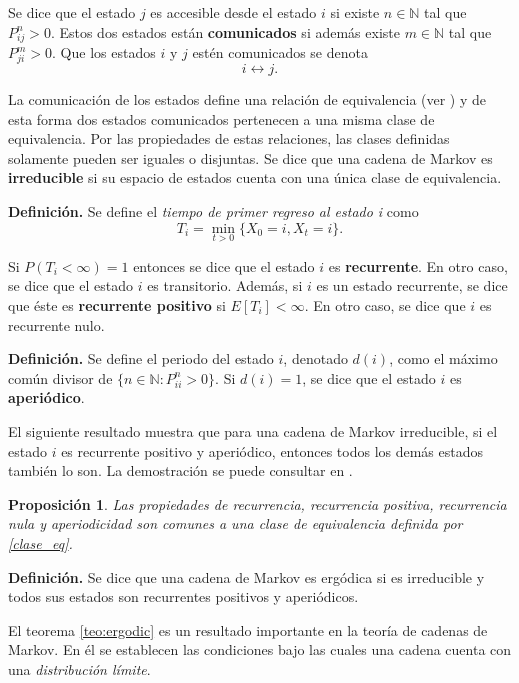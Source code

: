 \documentclass[11pt,a4paper]{article}
\newtheorem{proposition}{Proposición}[subsection]
\begin{document}
Se dice que el estado $j$ es accesible desde el estado $i$ si existe $n \in \mathbb{N}$ tal que $P_{ij}^n > 0$. Estos dos estados están \textbf{comunicados} si además existe $m \in \mathbb{N}$ tal que $P_{ji}^m > 0$. Que los estados $i$ y $j$ estén comunicados se denota
\begin{equation} \label{clase_eq}
i \leftrightarrow j.
\end{equation}

La comunicación de los estados define una relación de equivalencia (ver \citet{ross}) y de esta forma dos estados comunicados pertenecen a una misma clase de equivalencia. Por las propiedades de estas relaciones, las clases definidas solamente pueden ser iguales o disjuntas. Se dice que una cadena de Markov es \textbf{irreducible} si su espacio de estados cuenta con una única clase de equivalencia.

\textbf{Definición.} Se define el \textit{tiempo de primer regreso al estado i} como $$T_i = \min_{t>0} \lbrace X_0 = i, X_t = i \rbrace.$$

Si $P\left( T_i < \infty \right) = 1 $ entonces se dice que el estado $i$ es \textbf{recurrente}. En otro caso, se dice que el estado $i$ es transitorio. Además, si $i$ es un estado recurrente, se dice que éste es \textbf{recurrente positivo} si $E\left[T_i\right] < \infty$. En otro caso, se dice que $i$ es recurrente nulo.

\textbf{Definición.} Se define el periodo del estado $i$, denotado $d(i)$, como el máximo común divisor de $\lbrace n\in \mathbb{N}: P_{ii}^n > 0\rbrace.$ Si $d(i)=1$, se dice que el estado $i$ es \textbf{aperiódico}.

El siguiente resultado muestra que para una cadena de Markov irreducible, si el estado $i$ es recurrente positivo y aperiódico, entonces todos los demás estados también lo son. La demostración se puede consultar en \citet{ross}.

\begin{proposition}
Las propiedades de recurrencia, recurrencia positiva, recurrencia nula y aperiodicidad son comunes a una clase de equivalencia definida por \eqref{clase_eq}.
\end{proposition}

\textbf{Definición.} Se dice que una cadena de Markov es ergódica si es irreducible y todos sus estados son recurrentes positivos y aperiódicos.

El teorema \ref{teo:ergodic} es un resultado importante en la teoría de cadenas de Markov. En él se establecen las condiciones bajo las cuales una cadena cuenta con una \textit{distribución límite}.
\end{document}
